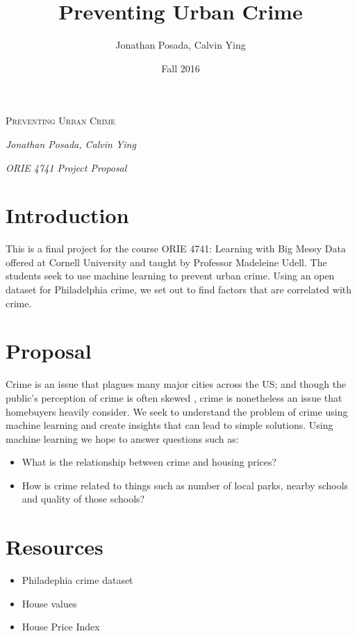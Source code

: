\documentclass[12pt,letterpaper]{article}
\title{Preventing Urban Crime}
\author{Jonathan Posada, Calvin Ying}
\date{Fall 2016}
\begin{document}
\begin{titlepage}
    \vspace*{0.5cm}
    \begin{center}
    {\scshape\huge Preventing Urban Crime \par}
    \vspace{1cm}
    {\itshape\large Jonathan Posada, Calvin Ying \par}
    \vspace{0.5cm}
    {\itshape\large ORIE 4741 Project Proposal \par}
    \vspace{1cm}
    
    \end{center}


\section*{Introduction}
This is a final project for the course ORIE 4741: Learning with Big Messy Data offered at Cornell University and taught by Professor Madeleine Udell. The students seek to use machine learning to prevent urban crime. Using an open dataset for Philadelphia crime, we set out to find factors that are correlated with crime.

\section*{Proposal}
Crime is an issue that plagues many major cities across the US; and though the public's perception of crime is often skewed \cite{crime_perception}, crime is nonetheless an issue that homebuyers heavily consider.
We seek to understand the problem of crime using machine learning and create insights that can lead to simple solutions. Using machine learning we hope to answer questions such as:
\begin{itemize}
\item What is the relationship between crime and housing prices?
\item How is crime related to things such as number of local parks, nearby schools and quality of those schools?
\end{itemize}

\section*{Resources}
\begin{itemize}  
\item Philadephia crime dataset \cite{kaggle}
\item House values \cite{zillow}
\item House Price Index \cite{fhfa}
\end{itemize}


\end{titlepage}
\end{document}
